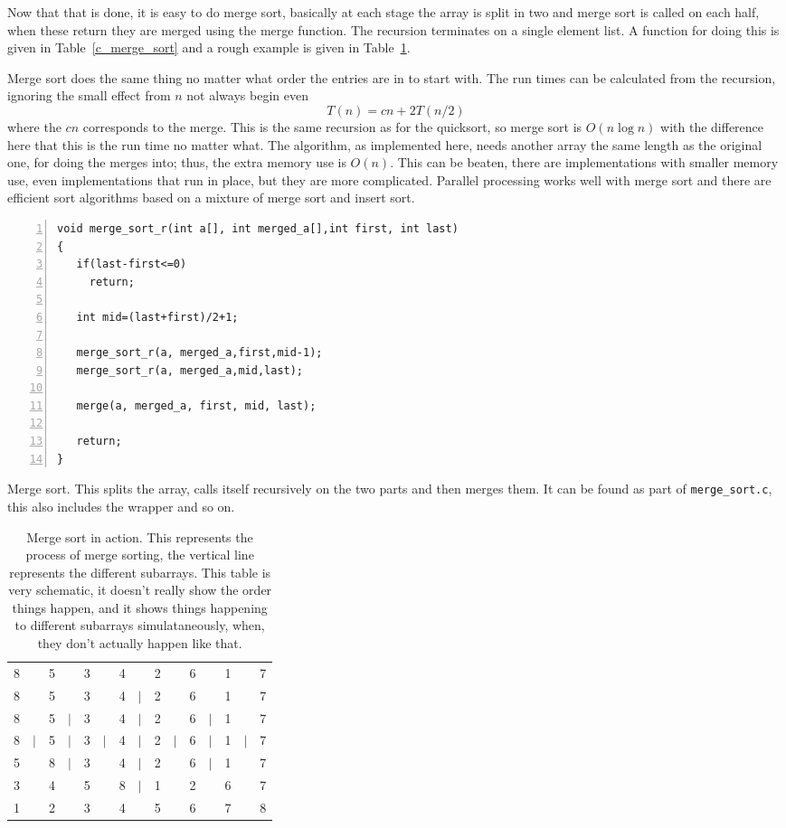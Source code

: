 \documentclass[11pt,a4paper]{scrartcl}
\begin{document}
Now that that is done, it is easy to do merge sort, basically at each
stage the array is split in two and merge sort is called on each half,
when these return they are merged using the merge function. The
recursion terminates on a single element list. A function for doing
this is given in Table~\ref{c_merge_sort} and a rough example is given
in Table~\ref{table_merge_sort}.

Merge sort does the same thing no matter what order the entries are in
to start with. The run times can be calculated from the recursion,
ignoring the small effect from $n$ not always begin even
\begin{equation}
T(n)=cn+2T(n/2)
\end{equation}
where the $cn$ corresponds to the merge. This is the same recursion as
for the quicksort, so merge sort is $O(n\log{n})$ with the difference
here that this is the run time no matter what. The algorithm, as
implemented here, needs another array the same length as the original
one, for doing the merges into; thus, the extra memory use is
$O(n)$. This can be beaten, there are implementations with smaller
memory use, even implementations that run in place, but they are more
complicated. Parallel processing works well with merge sort and there
are efficient sort algorithms based on a mixture of merge sort and
insert sort.

\begin{table}
\begin{lstlisting}[numbers=left]
void merge_sort_r(int a[], int merged_a[],int first, int last)
{
   if(last-first<=0)
     return;

   int mid=(last+first)/2+1;

   merge_sort_r(a, merged_a,first,mid-1);
   merge_sort_r(a, merged_a,mid,last);

   merge(a, merged_a, first, mid, last);

   return;
}
\end{lstlisting}
\caption{Merge sort. This splits the array, calls itself recursively
  on the two parts and then merges them. It can be found as part of
  {\tt merge\_sort.c}, this also includes the wrapper and so
  on. \label{c_merge_sort}}
\end{table}


\begin{table}
\begin{tabular}{ccccccccccccccc}
8&&5&&3&&4&&2&&6&&1&&7\\
8&&5&&3&&4&$|$&2&&6&&1&&7\\
8&&5&$|$&3&&4&$|$&2&&6&$|$&1&&7\\
8&$|$&5&$|$&3&$|$&4&$|$&2&$|$&6&$|$&1&$|$&7\\
5&&8&$|$&3&&4&$|$&2&&6&$|$&1&&7\\
3&&4&&5&&8&$|$&1&&2&&6&&7\\
1&&2&&3&&4&&5&&6&&7&&8
\end{tabular}
\caption{Merge sort in action. This represents the process of merge
  sorting, the vertical line represents the different subarrays. This
  table is very schematic, it doesn't really show the order things
  happen, and it shows things happening to different subarrays
  simulataneously, when, they don't actually happen like
  that.\label{table_merge_sort}}
\end{table}
\end{document}
